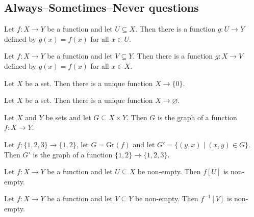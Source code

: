 \subsection*{Always--Sometimes--Never questions}


\begin{chapex} %
\label{cqFunctionsASNBegin}
Let $f : X \to Y$ be a function and let $U \subseteq X$. Then there is a function $g : U \to Y$ defined by $g(x) = f(x)$ for all $x \in U$.
\end{chapex}

\begin{chapex} %
Let $f : X \to Y$ be a function and let $V \subseteq Y$. Then there is a function $g : X \to V$ defined by $g(x) = f(x)$ for all $x \in X$.
\end{chapex}

\begin{chapex} %
Let $X$ be a set. Then there is a unique function $X \to \{ 0 \}$.
\end{chapex}

\begin{chapex} %
Let $X$ be a set. Then there is a unique function $X \to \varnothing$.
\end{chapex}

\begin{chapex} %
Let $X$ and $Y$ be sets and let $G \subseteq X \times Y$. Then $G$ is the graph of a function $f : X \to Y$.
\end{chapex}

\begin{chapex} %
Let $f : \{ 1, 2, 3 \} \to \{ 1, 2 \}$, let $G = \mathrm{Gr}(f)$ and let $G' = \{ (y,x) \mid (x,y) \in G \}$. Then $G'$ is the graph of a function $\{ 1, 2 \} \to \{ 1, 2, 3 \}$.
\end{chapex}

\begin{chapex} %
Let $f : X \to Y$ be a function and let $U \subseteq X$ be non-empty. Then $f[U]$ is non-empty.
\end{chapex}

\begin{chapex} %
Let $f : X \to Y$ be a function and let $V \subseteq Y$ be non-empty. Then $f^{-1}[V]$ is non-empty.
\end{chapex}

